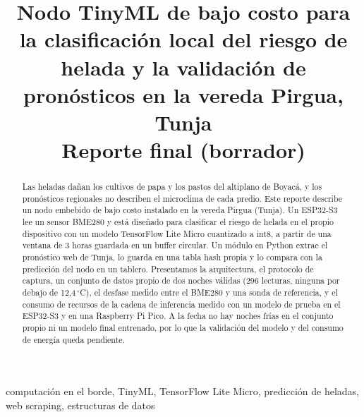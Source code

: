 \documentclass[conference]{IEEEtran}
\begin{document}
\title{Nodo TinyML de bajo costo para la clasificaci\'on local del riesgo de helada y la validaci\'on de pron\'osticos en la vereda Pirgua, Tunja\\
{\large Reporte final (borrador)}}

\author{
\and
{}
\and
{}
}

\maketitle

\begin{abstract}
Las heladas da\~nan los cultivos de papa y los pastos del altiplano de Boyac\'a, y los pron\'osticos regionales no describen el microclima de cada predio. Este reporte describe un nodo embebido de bajo costo instalado en la vereda Pirgua (Tunja). Un ESP32-S3 lee un sensor BME280 y est\'a dise\~nado para clasificar el riesgo de helada en el propio dispositivo con un modelo TensorFlow Lite Micro cuantizado a int8, a partir de una ventana de 3 horas guardada en un buffer circular. Un m\'odulo en Python extrae el pron\'ostico web de Tunja, lo guarda en una tabla hash propia y lo compara con la predicci\'on del nodo en un tablero. Presentamos la arquitectura, el protocolo de captura, un conjunto de datos propio de dos noches v\'alidas (296 lecturas, ninguna por debajo de 12,4\,$^\circ$C), el desfase medido entre el BME280 y una sonda de referencia, y el consumo de recursos de la cadena de inferencia medido con un modelo de prueba en el ESP32-S3 y en una Raspberry Pi Pico. A la fecha no hay noches fr\'ias en el conjunto propio ni un modelo final entrenado, por lo que la validaci\'on del modelo y del consumo de energ\'ia queda pendiente.
\end{abstract}

\begin{IEEEkeywords}
computaci\'on en el borde, TinyML, TensorFlow Lite Micro, predicci\'on de heladas, web scraping, estructuras de datos
\end{IEEEkeywords}
\end{document}
